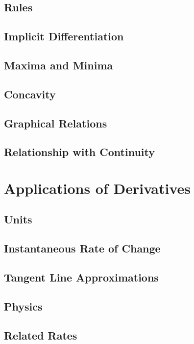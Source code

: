 \documentclass{article}
\begin{document}
\subsection{Rules} 
\subsection{Implicit Differentiation}
\subsection{Maxima and Minima} 
\subsection{Concavity} 
\subsection{Graphical Relations} 
\subsection{Relationship with Continuity} 

\section{Applications of Derivatives}
\subsection{Units}
\subsection{Instantaneous Rate of Change}
\subsection{Tangent Line Approximations}
\subsection{Physics}
\subsection{Related Rates}
\end{document}
